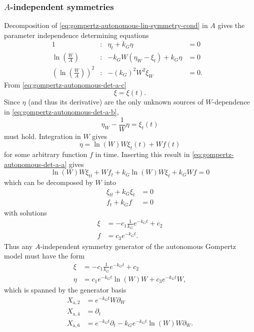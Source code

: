 \subsubsection{\texorpdfstring{\(A\)-independent symmetries}{Carrying capacity-independent symmetries}}

Decomposition of \cref{eq:gompertz-autonomous-lin-symmetry-cond} in \(A\) gives the parameter independence determining equations
\begin{subequations}
  \begin{flalign}
    1 & : & \eta_t + k_G \eta &= 0 &\label{eq:gompertz-autonomous-det-a-a}\\
    \ln\left(\frac{W}{A}\right) & : & - k_G W\left(\eta_W - \xi_t\right)  + k_G \eta &= 0 &\label{eq:gompertz-autonomous-det-a-b}\\
    \left(\ln\left(\frac{W}{A}\right)\right)^2 & : & - (k_G)^2 W^2 \xi_W &= 0. &\label{eq:gompertz-autonomous-det-a-c}
  \end{flalign}
\end{subequations}
From \cref{eq:gompertz-autonomous-det-a-c}
\begin{equation*}
  \xi = \xi(t).
\end{equation*}
Since \(\eta\) (and thus its derivative) are the only unknown sources of \(W\)-dependence in \cref{eq:gompertz-autonomous-det-a-b},
\begin{equation*}
  \eta_W - \frac{1}{W}\eta = \xi_t(t)
\end{equation*}
must hold.
Integration in \(W\) gives
\begin{equation*}
  \eta = \ln\left(W\right) W \xi_t(t) + W f(t)
\end{equation*}
for some arbitrary function \(f\) in time.
Inserting this result in \cref{eq:gompertz-autonomous-det-a-a} gives
\begin{equation*}
  \ln\left(W\right) W \xi_{tt} + W f_t + k_G \ln\left(W\right) W \xi_t + k_G W f = 0
\end{equation*}
which can be decomposed by \(W\) into
\begin{align*}
  \xi_{tt} + k_G \xi_t &= 0 \\
  f_t + k_G f &= 0
\end{align*}
with solutions
\begin{align*}
  \xi &= - c_1 \frac{1}{k_G} e^{-k_G t} + c_2 \\
  f &= c_3 e^{-k_G t}.
\end{align*}
Thus any \(A\)-independent symmetry generator of the autonomous Gompertz model  must have the form
\begin{align*}
  \xi &= - c_1 \frac{1}{k_G} e^{-k_G t} + c_2 \\
  \eta &= c_1 e^{-k_G t} \ln\left(W\right) W  + c_3 e^{-k_G t} W,
\end{align*}
which is spanned by the generator basis
\begin{align*}
  X_{\text{a},2} &= e^{-k_G t} W \partial_W \\
  X_{\text{a},4} &= \partial_t \\
  X_{\text{a},6} &= e^{-k_G t} \partial_t - k_G e^{-k_G t} \ln\left(W\right) W \partial_W.
\end{align*}

